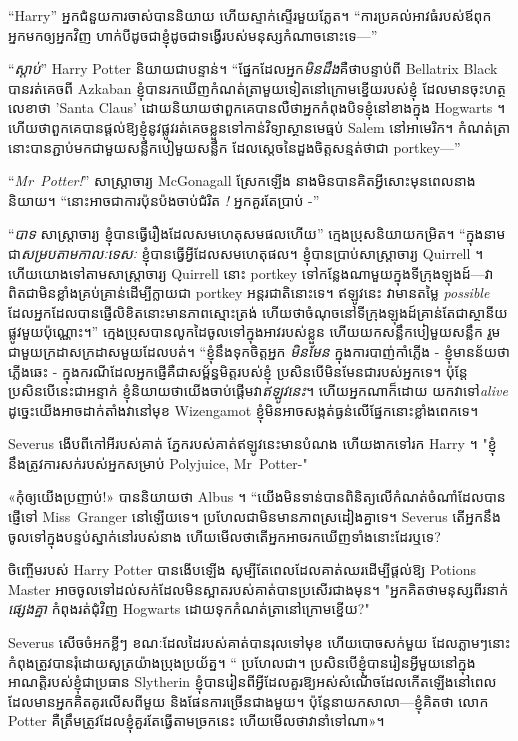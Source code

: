 {{{“Harry” អ្នកជំនួយការចាស់បាននិយាយ ហើយស្ទាក់ស្ទើរមួយភ្លែត។ “ការប្រគល់អាវធំរបស់ឪពុកអ្នកមកឲ្យអ្នកវិញ ហាក់បីដូចជាខ្ញុំដូចជាទង្វើរបស់មនុស្សកំណាចនោះទេ—”

“\emph{ស្តាប់}” Harry Potter និយាយជាបន្ទាន់។ “ផ្នែកដែលអ្នក\emph{មិនដឹង}គឺថាបន្ទាប់ពី Bellatrix Black បានរត់គេចពី Azkaban ខ្ញុំបានរកឃើញកំណត់ត្រាមួយទៀតនៅក្រោមខ្នើយរបស់ខ្ញុំ ដែលមានចុះហត្ថលេខាថា 'Santa Claus' ដោយនិយាយថាពួកគេបានលឺថាអ្នកកំពុងបិទខ្ញុំនៅខាងក្នុង Hogwarts ។ ហើយថាពួកគេបានផ្តល់ឱ្យខ្ញុំនូវផ្លូវរត់គេចខ្លួនទៅកាន់វិទ្យាស្ថានមេធ្មប់ Salem នៅអាមេរិក។ កំណត់ត្រានោះបានភ្ជាប់មកជាមួយសន្លឹកបៀមួយសន្លឹក ដែលស្តេចនៃដួងចិត្តសន្មត់ថាជា portkey—”

“\emph{Mr~Potter!}” សាស្ត្រាចារ្យ McGonagall ស្រែកឡើង នាងមិនបានគិតអ្វីសោះមុនពេលនាងនិយាយ។ “នោះអាចជាការប៉ុនប៉ងចាប់ជំរិត \emph! អ្នកគួរតែប្រាប់ -”

“\emph{បាទ} សាស្រ្តាចារ្យ ខ្ញុំបានធ្វើរឿងដែលសមហេតុសមផលហើយ” ក្មេងប្រុសនិយាយកម្រិត។ “ក្នុងនាមជា\emph{សម្របតាមកាលៈទេសៈ} ខ្ញុំបានធ្វើអ្វីដែលសមហេតុផល។ ខ្ញុំបានប្រាប់សាស្រ្តាចារ្យ Quirrell ។ ហើយយោងទៅតាមសាស្រ្តាចារ្យ Quirrell នោះ portkey ទៅកន្លែងណាមួយក្នុងទីក្រុងឡុងដ៍—វាពិតជាមិនខ្លាំងគ្រប់គ្រាន់ដើម្បីក្លាយជា portkey អន្តរជាតិនោះទេ។ ឥឡូវនេះ វាមានតម្លៃ \emph{possible} ដែលអ្នកដែលបានផ្ញើលិខិតនោះមានភាពស្មោះត្រង់ ហើយថាចំណុចនៅទីក្រុងឡុងដ៍គ្រាន់តែជាស្ថានីយផ្លូវមួយប៉ុណ្ណោះ។” ក្មេង​ប្រុស​បាន​លូក​ដៃ​ចូល​ទៅ​ក្នុង​អាវ​របស់​ខ្លួន ហើយ​យក​សន្លឹក​បៀ​មួយ​សន្លឹក រួម​ជាមួយ​ក្រដាស​ក្រដាស​មួយ​ដែល​បត់។ “ខ្ញុំនឹងទុកចិត្តអ្នក \emph{មិនមែន} ក្នុងការបាញ់កាំភ្លើង - ខ្ញុំមានន័យថា ភ្លើងឆេះ - ក្នុងករណីដែលអ្នកផ្ញើគឺជាសម្ព័ន្ធមិត្តរបស់ខ្ញុំ ប្រសិនបើមិនមែនជារបស់អ្នកទេ។ ប៉ុន្តែប្រសិនបើនេះជាអន្ទាក់ ខ្ញុំនិយាយថាយើងចាប់ផ្តើមវា\emph{ឥឡូវនេះ}។ ហើយអ្នកណាក៏ដោយ យកវាទៅ\emph{alive} ដូច្នេះយើងអាចដាក់តាំងវានៅមុខ Wizengamot ខ្ញុំមិនអាចសង្កត់ធ្ងន់លើផ្នែកនោះខ្លាំងពេកទេ។

Severus ងើបពីកៅអីរបស់គាត់ ភ្នែករបស់គាត់ឥឡូវនេះមានបំណង ហើយងាកទៅរក Harry ។ "ខ្ញុំនឹងត្រូវការសក់របស់អ្នកសម្រាប់ Polyjuice, Mr~Potter-"

«កុំ​ឲ្យ​យើង​ប្រញាប់!» បាននិយាយថា Albus ។ “យើងមិនទាន់បានពិនិត្យលើកំណត់ចំណាំដែលបានផ្ញើទៅ Miss~Granger នៅឡើយទេ។ ប្រហែលជាមិនមានភាពស្រដៀងគ្នាទេ។ Severus តើ​អ្នក​នឹង​ចូល​ទៅ​ក្នុង​បន្ទប់​ស្នាក់​នៅ​របស់​នាង ហើយ​មើល​ថា​តើ​អ្នក​អាច​រក​ឃើញ​ទាំង​នោះ​ដែរ​ឬ​ទេ?

ចិញ្ចើមរបស់ Harry Potter បានងើបឡើង សូម្បីតែពេលដែលគាត់ឈរដើម្បីផ្តល់ឱ្យ Potions Master អាចចូលទៅដល់សក់ដែលមិនស្អាតរបស់គាត់បានប្រសើរជាងមុន។ "អ្នកគិតថាមនុស្សពីរនាក់ \emph{ផ្សេងគ្នា} កំពុងរត់ជុំវិញ Hogwarts ដោយទុកកំណត់ត្រានៅក្រោមខ្នើយ?"

Severus សើចចំអកខ្លីៗ ខណៈដែលដៃរបស់គាត់បានរុលទៅមុខ ហើយបោចសក់មួយ ដែលភ្លាមៗនោះកំពុងត្រូវបានរុំដោយសូត្រយ៉ាងប្រុងប្រយ័ត្ន។ “ ប្រហែលជា។ ប្រសិនបើខ្ញុំបានរៀនអ្វីមួយនៅក្នុងអាណត្តិរបស់ខ្ញុំជាប្រធាន Slytherin ខ្ញុំបានរៀនពីអ្វីដែលគួរឱ្យអស់សំណើចដែលកើតឡើងនៅពេលដែលមានអ្នកគិតគូរលើសពីមួយ និងផែនការច្រើនជាងមួយ។ ប៉ុន្តែ​នាយក​សាលា—ខ្ញុំ​គិត​ថា លោក ~ Potter គឺ​ត្រឹមត្រូវ​ដែល​ខ្ញុំ​គួរ​តែ​ធ្វើ​តាម​ច្រក​នេះ ហើយ​មើល​ថា​វា​នាំ​ទៅ​ណា»។

}}}
